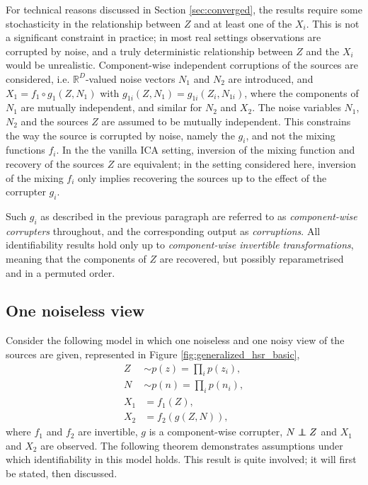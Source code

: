 For technical reasons discussed in Section
\ref{sec:converged}, the results require some stochasticity in the relationship between $Z$ and at least one of the $X_i$.
This is not a significant constraint in practice; in most real settings observations are corrupted by noise, and a truly deterministic relationship between $Z$ and the $X_i$ would be unrealistic.
Component-wise independent corruptions of the sources are considered, i.e. $\mathbb{R}^D$-valued noise vectors $N_1$ and $N_2$ are introduced, and $X_1 = f_1 \circ g_1(Z, N_1)$ with $g_{1i}(Z, N_1) = g_{1i}(Z_i, N_{1i})$, where the components of $N_{1}$ are mutually independent, and similar for $N_2$ and $X_2$. 
The noise variables $N_1$, $N_2$ and the sources $Z$ are assumed to be mutually independent.
This constrains the way the source is corrupted by noise, namely the $g_i$, and not the mixing functions $f_i$.
In the the vanilla ICA setting, inversion of the mixing function and recovery of the sources $Z$ are equivalent; in the setting considered here, inversion of the mixing $f_i$ only implies recovering the sources up to the effect of the corrupter $g_i$.

Such $g_i$ as described in the previous paragraph are referred to as \emph{component-wise corrupters} throughout, and the corresponding output as \emph{corruptions}. 
All identifiability results hold only up to \emph{component-wise invertible transformations}, meaning that the components of $Z$ are recovered, but possibly reparametrised and in a permuted order. 





\subsection{One noiseless view}
\label{sec:onenoisless}
Consider the following model in which one noiseless and one noisy view of the sources are given, represented in Figure \ref{fig:generalized_hsr_basic}, 
%
\begin{align}
Z &\sim p(z) = \prod_{i} p(z_i), \label{eq:indep}\\
N &\sim p(n) = \prod_{i} p(n_i), \nonumber  \\
X_{1}&= f_{1}(Z) \label{eq:sem2_1}, \\
X_{2}&= f_{2}( g(Z, N)) \label{eq:sem2_2},
\end{align}
%
where $f_1$ and $f_2$ are invertible, $g$ is a component-wise corrupter, $N \independent Z$ and $X_1$ and $X_2$ are observed.
The following theorem demonstrates assumptions under which identifiability in this model holds.
This result is quite involved; it will first be stated, then discussed.

